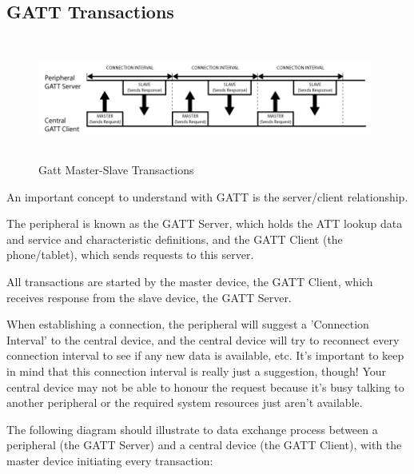 \documentclass[11pt,a4paper]{article}
\begin{document}
	\subsection{GATT Transactions}
	\begin{figure}[h]
    \centering
    \includegraphics[width=11cm,height=4cm]{GattTransactions.png}
    \caption{Gatt Master-Slave Transactions}
    \end{figure}
	{An important concept to understand with GATT is the server/client relationship.

The peripheral is known as the GATT Server, which holds the ATT lookup data and service and characteristic definitions, and the GATT Client (the phone/tablet), which sends requests to this server.

All transactions are started by the master device, the GATT Client, which receives response from the slave device, the GATT Server.

When establishing a connection, the peripheral will suggest a 'Connection Interval' to the central device, and the central device will try to reconnect every connection interval to see if any new data is available, etc. It's important to keep in mind that this connection interval is really just a suggestion, though! Your central device may not be able to honour the request because it's busy talking to another peripheral or the required system resources just aren't available.

The following diagram should illustrate to data exchange process between a peripheral (the GATT Server) and a central device (the GATT Client), with the master device initiating every transaction:}

    \newpage
\end{document}

